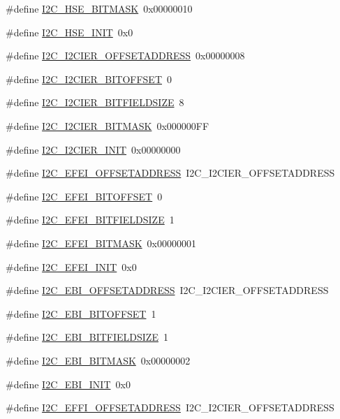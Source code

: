\begin{DoxyCompactItemize}
\#define \hyperlink{a00558_a3bbd37beba21f6ed0274d3bbb8153eb7}{I2C\_\-HSE\_\-BITMASK}~0x00000010
\item 
\#define \hyperlink{a00558_a5ae08d0372c0890677613c3b3ac5e213}{I2C\_\-HSE\_\-INIT}~0x0
\item 
\#define \hyperlink{a00558_ad352c904e03a40b2a8af5c8ef71272d9}{I2C\_\-I2CIER\_\-OFFSETADDRESS}~0x00000008
\item 
\#define \hyperlink{a00558_a96de71e67c22007f3f7396fbdd63275b}{I2C\_\-I2CIER\_\-BITOFFSET}~0
\item 
\#define \hyperlink{a00558_aa64cd29d70af25686170c391c33d97ab}{I2C\_\-I2CIER\_\-BITFIELDSIZE}~8
\item 
\#define \hyperlink{a00558_a85aee0be9ab351c1c4b7132f709fc346}{I2C\_\-I2CIER\_\-BITMASK}~0x000000FF
\item 
\#define \hyperlink{a00558_a1c937f500862380674ae1cce4ec04917}{I2C\_\-I2CIER\_\-INIT}~0x00000000
\item 
\#define \hyperlink{a00558_a7ec20287609ad91f90af5f21c8203257}{I2C\_\-EFEI\_\-OFFSETADDRESS}~I2C\_\-I2CIER\_\-OFFSETADDRESS
\item 
\#define \hyperlink{a00558_a7841b90d672b820a8d871ed68157786d}{I2C\_\-EFEI\_\-BITOFFSET}~0
\item 
\#define \hyperlink{a00558_a52046e9efd7265a136b9980a370cf649}{I2C\_\-EFEI\_\-BITFIELDSIZE}~1
\item 
\#define \hyperlink{a00558_a2aae738d3bec36e1dc2cae3ea35f94f6}{I2C\_\-EFEI\_\-BITMASK}~0x00000001
\item 
\#define \hyperlink{a00558_aba537e1b8257355baccdaed35b040557}{I2C\_\-EFEI\_\-INIT}~0x0
\item 
\#define \hyperlink{a00558_a09ab6175f520e3faa44612a7b44c8d03}{I2C\_\-EBI\_\-OFFSETADDRESS}~I2C\_\-I2CIER\_\-OFFSETADDRESS
\item 
\#define \hyperlink{a00558_a7af79be0ee7d90fe784546a459cac734}{I2C\_\-EBI\_\-BITOFFSET}~1
\item 
\#define \hyperlink{a00558_a6e1f892aa617f719cbc7ed50339ff4d4}{I2C\_\-EBI\_\-BITFIELDSIZE}~1
\item 
\#define \hyperlink{a00558_aca503434f53718ea2884ac687fa31817}{I2C\_\-EBI\_\-BITMASK}~0x00000002
\item 
\#define \hyperlink{a00558_a0f86739c5e48834a500e521008ed64ed}{I2C\_\-EBI\_\-INIT}~0x0
\item 
\#define \hyperlink{a00558_af16c70bd3731b6bc43cedf9e073f8984}{I2C\_\-EFFI\_\-OFFSETADDRESS}~I2C\_\-I2CIER\_\-OFFSETADDRESS
\item 

\end{DoxyCompactItemize}
